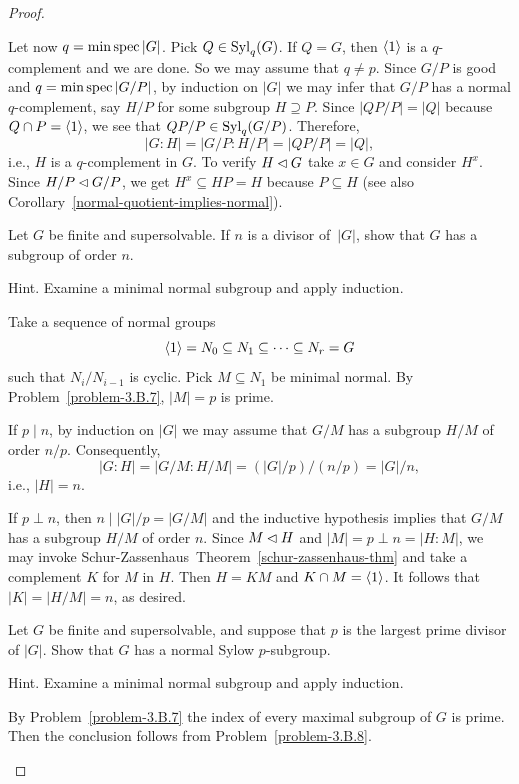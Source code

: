 \begin{proof}
\begin{solution}
Let now $q=\min\operatorname{spec}|G|$. Pick $Q\in{\rm Syl}_q(G)$. If $Q=G$, then $\langle1\rangle$ is a $q$-complement and we are done. So we may assume that $q\ne p$. Since $G/P$ is good and $q=\min\operatorname{spec}|G/P|$, by induction on $|G|$ we may infer that $G/P$ has a normal $q$-complement, say $H/P$ for some subgroup $H\supseteq P$. Since $|QP/P|=|Q|$ because $Q\cap P=\langle1\rangle$, we see that $QP/P\in{\rm Syl}_q(G/P)$. Therefore,
$$
    |G:H|=|G/P:H/P|=|QP/P|=|Q|,
$$
i.e., $H$ is a $q$-complement in $G$. To verify $H\lhd G$ take $x\in G$ and consider $H^x$. Since $H/P\lhd G/P$, we get $H^x\subseteq HP=H$ because $P\subseteq H$ (see also Corollary~\ref{normal-quotient-implies-normal}).  \end{solution}

\begin{probl}
    Let\/ $G$ be finite and supersolvable. If\/ $n$ is a divisor of\/~$|G|$, show that\/ $G$ has a subgroup of order\/ $n$.
    
    {\upshape Hint. Examine a minimal normal subgroup and apply induction.}
\end{probl}

\begin{solution} Take a sequence of normal groups
$$
    \langle1\rangle=N_0\subseteq N_1\subseteq\cdots\subseteq N_r=G
$$
such that $N_i/N_{i-1}$ is cyclic. Pick $M\subseteq N_1$ be minimal normal. By Problem~\ref{problem-3.B.7}, $|M|=p$ is prime.

If $p\mid n$, by induction on $|G|$ we may assume that $G/M$ has a subgroup $H/M$ of order $n/p$. Consequently,
$$
    |G:H|=|G/M:H/M|=(|G|/p)/(n/p)=|G|/n,
$$
i.e., $|H|=n$.

If $p\perp n$, then $n\mid |G|/p=|G/M|$ and the inductive hypothesis implies that $G/M$ has a subgroup $H/M$ of order $n$. Since $M\lhd H$ and $|M|=p\perp n=|H:M|$, we may invoke Schur-Zassenhaus~Theorem~\ref{schur-zassenhaus-thm} and take a complement $K$ for $M$ in $H$. Then $H=KM$ and $K\cap M=\langle1\rangle$. It follows that $|K|=|H/M|=n$, as desired.  \end{solution}


\begin{probl}
    Let\/ $G$ be finite and supersolvable, and suppose that\/ $p$ is the largest prime divisor of\/ $|G|$. Show that\/ $G$ has a normal Sylow\/ $p$-subgroup.

    {\upshape Hint. Examine a minimal normal subgroup and apply induction.}
\end{probl}

\begin{solution} By Problem~\ref{problem-3.B.7} the index of every maximal subgroup of $G$ is prime. Then the conclusion follows from Problem~\ref{problem-3.B.8}.  \end{solution}


\end{proof}
